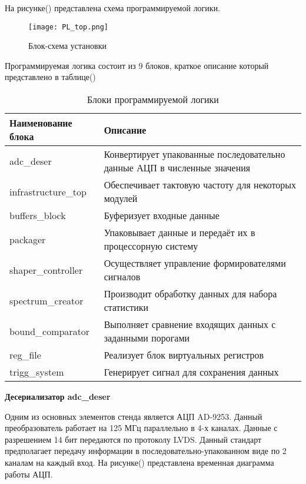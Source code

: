 На рисунке() представлена схема программируемой логики.\par 
\begin{figure}[ht]
    \centering
    \texttt{[image: PL\_top.png]}
    \caption{Блок-схема установки}
    \label{fig:mpr}
\end{figure}
Программируемая логика состоит из 9 блоков, краткое описание который представлено в таблице()\par
\begin{table}[h!]
    \caption{Блоки программируемой логики}
    \begin{tabular}{|p{}|p{}|}
        \hline
        Наименование блока & Описание \\
        \hline
        adc\_deser & Конвертирует упакованные последовательно данные АЦП в численные значения \\
        \hline
        infrastructure\_top & Обеспечивает тактовую частоту для некоторых модулей \\
        \hline
        buffers\_block & Буферизует входные данные \\
        \hline
        packager & Упаковывает данные и передаёт их в процессорную систему \\
        \hline
        shaper\_controller & Осуществляет управление формирователями сигналов \\
        \hline
        spectrum\_creator & Производит обработку данных для набора статистики \\
        \hline
        bound\_comparator & Выполняет сравнение входящих данных с заданными порогами \\
        \hline
        reg\_file & Реализует блок виртуальных регистров \\
        \hline
        trigg\_system & Генерирует сигнал для сохранения данных \\
        \hline
    \end{tabular}
\end{table}
\textbf{Десериализатор adc\_deser}\par
Одним из основных элементов стенда является АЦП AD-9253. Данный преобразователь работает на 125 МГц параллельно в 4-х каналах. Данные с разрешением 14 бит передаются по протоколу LVDS. Данный стандарт предполагает передачу информации в последовательно-упакованном виде по 2 каналам на каждый вход. На рисунке() представлена временная диаграмма работы АЦП.\par
